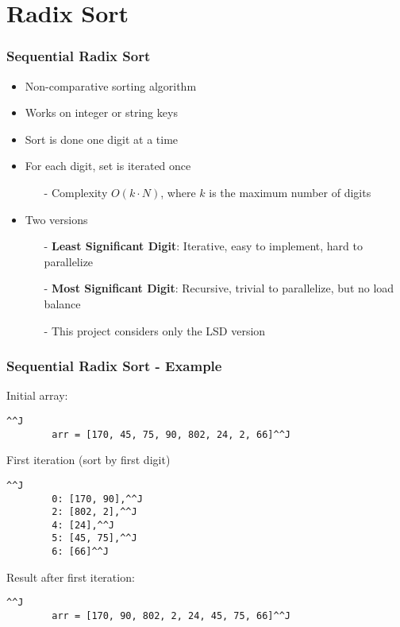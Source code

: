 \section{Radix Sort}

\begin{frame}
	\frametitle{Sequential Radix Sort}

	\begin{itemize}\itemsep=10pt
		\item Non-comparative sorting algorithm
		\item Works on integer or string keys
		\item Sort is done one digit at a time
		\item For each digit, set is iterated once
		\begin{itemize}
			\item[-] Complexity $O(k \cdot N)$, where $k$ is the maximum number of digits
		\end{itemize}

		\item Two versions
			\begin{itemize}
				\item[-] \textbf{Least Significant Digit}: Iterative, easy to implement, hard to parallelize
				\item[-] \textbf{Most Significant Digit}: Recursive, trivial to parallelize, but no load balance
				\item[-] This project considers only the LSD version
			\end{itemize}
	\end{itemize}
\end{frame}

\begin{frame}
   \frametitle{Sequential Radix Sort - Example}

	Initial array:
	\begin{lstlisting}^^J
		arr = [170, 45, 75, 90, 802, 24, 2, 66]^^J
	\end{lstlisting}

	First iteration (sort by first digit)
	\begin{lstlisting}^^J
		0: [170, 90],^^J
		2: [802, 2],^^J
		4: [24],^^J
		5: [45, 75],^^J
		6: [66]^^J
	\end{lstlisting}

	Result after first iteration:
	\begin{lstlisting}^^J
		arr = [170, 90, 802, 2, 24, 45, 75, 66]^^J
	\end{lstlisting}
	
\end{frame}

